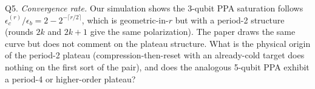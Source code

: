 \documentclass[11pt]{article}
\begin{document}
Q5. \emph{Convergence rate.} Our simulation shows the 3-qubit PPA saturation
follows $\epsilon_c^{(r)}/\epsilon_b = 2 - 2^{-\lceil r/2 \rceil}$, which is
geometric-in-$r$ but with a period-2 structure (rounds $2k$ and $2k+1$ give
the same polarization). The paper draws the same curve but does not comment
on the plateau structure. What is the physical origin of the period-2
plateau (compression-then-reset with an already-cold target does nothing on
the first sort of the pair), and does the analogous 5-qubit PPA exhibit a
period-4 or higher-order plateau?
\end{document}
